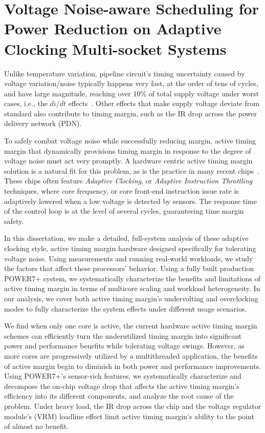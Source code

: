 
\chapter{Voltage Noise-aware Scheduling for Power Reduction on Adaptive Clocking Multi-socket Systems}

\label{sec:voltage}

Unlike temperature variation, pipeline circuit's timing uncertainty caused by voltage variation/noise typically happens very fast, at the order of tens of cycles, and have large magnitude, reaching over 10\% of total supply voltage under worst cases, i.e., the $di/dt$ effects~\cite{reddi2010voltage}. Other effects that make supply voltage deviate from standard also contribute to timing margin, such as the IR drop across the power delivery network (PDN).

To safely combat voltage noise while successfully reducing margin, active timing margin that dynamically provisions timing margin in response to the degree of voltage noise must act very promptly. A hardware centric active timing margin solution is a natural fit for this problem, as is the practice in many recent chips~\cite{kurd2008next,lefurgy2011active,bowman201222nm,grenat20145,tokunaga20145,bowman20158}. These chips often feature \textit{Adaptive Clocking}, or \textit{Adaptive Instruction Throttling}~\cite{webel2015robust} techniques, where core frequency, or core front-end instruction issue rate is adaptively lowered when a low voltage is detected by sensors. The response time of the control loop is at the level of several cycles, guaranteeing time margin safety.

In this dissertation, we make a detailed, full-system analysis of these adaptive clocking style, active timing margin hardware designed specifically for tolerating voltage noise. Using measurements and running real-world workloads, we study the factors that affect these processors' behavior. Using a fully built production POWER7+ system, we systematically characterize the benefits and limitations of active timing margin in terms of multicore scaling and workload heterogeneity. In our analysis, we cover both active timing margin's undervolting and overclocking modes to fully characterize the system effects under different usage scenarios. 

We find when only one core is active, the current hardware active timing margin schemes can efficiently turn the underutilized timing margin into significant power and performance benefits while tolerating voltage swings. However, as more cores are progressively utilized by a multithreaded application, the benefits of active margin begin to diminish in both power and performance improvements. Using POWER7+'s sensor-rich features, we systematically characterize and decompose the on-chip voltage drop that affects the active timing margin's efficiency into its different components, and analyze the root cause of the problem. Under heavy load, the IR drop across the chip and the voltage regulator module's (VRM) loadline effect limit active timing margin's ability to the point of almost no benefit. 

